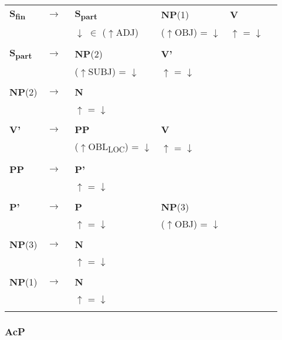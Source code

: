 \documentclass[12pt,a4paper]{article}
\begin{document}
\begin{tabular}{ l  l  l  l  l  l }
  \textbf{S\textsubscript{fin}} & $\rightarrow$ & \: \: \textbf{S\textsubscript{part}} & \: \: \textbf{NP}(1) & \: \textbf{V}\\
   & $\qquad$ &  $\downarrow$ $\in$ ($\uparrow$ADJ) & ($\uparrow$OBJ) = $\downarrow$ & $\uparrow$ = $\downarrow$ \\
   $\qquad$ & $\qquad$ \\
   \textbf{S\textsubscript{part}} & $\rightarrow$ & \: \: \textbf{NP}(2) & \: \textbf{V'}\\
   & $\qquad$ & ($\uparrow$SUBJ) = $\downarrow$ & $\uparrow$ = $\downarrow$ \\
   $\qquad$ & $\qquad$ \\
    \textbf{NP}(2) & $\rightarrow$ & \: \textbf{N} \\
   & $\qquad$ & $\uparrow$ = $\downarrow$\\
      $\qquad$ & $\qquad$ \\
    \textbf{V'} & $\rightarrow$ & \: \: \textbf{PP} & \: \: \textbf{V} & \\
   & $\qquad$ &($\uparrow$OBL\textsubscript{LOC}) = $\downarrow$  & \: $\uparrow$ = $\downarrow$\\
   $\qquad$ & $\qquad$ \\
    \textbf{PP} & $\rightarrow$ & \: \textbf{P'} \\
	& $\qquad$   & $\uparrow$ = $\downarrow$\\
   $\qquad$ & $\qquad$ \\
    \textbf{P'} & $\rightarrow$ & \: \textbf{P} & \: \: \textbf{NP}(3) \\
   & $\qquad$ & $\uparrow$ = $\downarrow$ & ($\uparrow$OBJ) = $\downarrow$ \\
   $\qquad$ & $\qquad$ \\
    \textbf{NP}(3) & $\rightarrow$ & \: \textbf{N} \\
   & $\qquad$ & $\uparrow$ = $\downarrow$\\
      $\qquad$ & $\qquad$ \\     
          \textbf{NP}(1) & $\rightarrow$ & \: \textbf{N} \\
   & $\qquad$ & $\uparrow$ = $\downarrow$\\
      $\qquad$ & $\qquad$ \\     
\end{tabular} 


\subsubsection{AcP}
\end{document}
